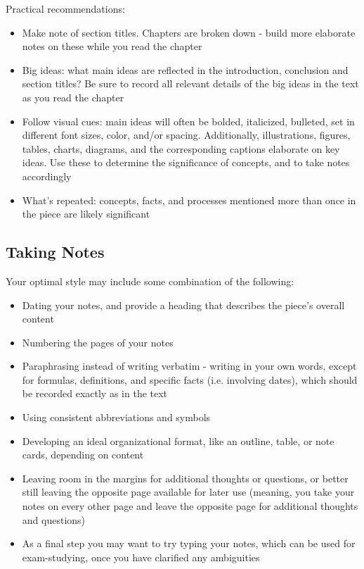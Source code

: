 Practical recommendations:
\begin{itemize}
\item Make note of section titles. Chapters are broken down - build more elaborate notes on these while you read the chapter
\item Big ideas: what main ideas are reflected in the introduction, conclusion and section titles? Be sure to record all relevant details of the big ideas in the text as you read the chapter
\item Follow visual cues: main ideas will often be bolded, italicized, bulleted, set in different font sizes, color, and/or spacing. Additionally, illustrations, figures, tables, charts, diagrams, and the corresponding captions elaborate on key ideas. Use these to determine the significance of concepts, and to take notes accordingly
\item What's repeated: concepts, facts, and processes mentioned more than once in the piece are likely significant
\end{itemize}

\subsection{Taking Notes}
Your optimal style may include some combination of the following:
\begin{itemize}
\item Dating your notes, and provide a heading that describes the piece's overall content
\item Numbering the pages of your notes
\item Paraphrasing instead of writing verbatim - writing in your own words, except for formulas, definitions, and specific facts (i.e. involving dates), which should be recorded exactly as in the text
\item Using consistent abbreviations and symbols
\item Developing an ideal organizational format, like an outline, table, or note cards, depending on content
\item Leaving room in the margins for additional thoughts or questions, or better still leaving the opposite page available for later use (meaning, you take your notes on every other page and leave the opposite page for additional thoughts and questions)
\item As a final step you may want to try typing your notes, which can be used for exam-studying, once you have clarified any ambiguities
\end{itemize}

